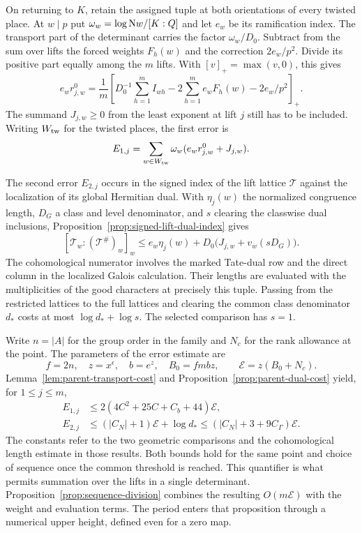 On returning to \(K\), retain the assigned tuple at both orientations of every twisted place. At \(w\mid p\) put \(\omega_w=\log{\rm N}w/[K:\mathbb Q]\) and let \(e_w\) be its ramification index. The transport part of the determinant carries the factor \(\omega_w/D_0\). Subtract from the sum over lifts the forced weights \(F_h(w)\) and the correction \(2e_w/p^2\). Divide its positive part equally among the \(m\) lifts. With \([v]_+=\max(v,0)\), this gives
\[
 e_w r^0_{j,w}=\frac1m\left[
 D_0^{-1}\sum_{h=1}^m I_{wh}-2\sum_{h=1}^m e_wF_h(w)-2e_w/p^2\right]_+ .
\]
The summand \(J_{j,w}\ge0\) from the least exponent at lift \(j\) still has to be included. Writing \(W_{\rm tw}\) for the twisted places, the first error is
\[
           E_{1,j}=\sum_{w\in W_{\rm tw}}\omega_w(e_wr^0_{j,w}+J_{j,w}).
\]

The second error \(E_{2,j}\) occurs in the signed index of the lift lattice \(\mathcal T\) against the localization of its global Hermitian dual. With \(\eta_j(w)\) the normalized congruence length, \(D_G\) a class and level denominator, and \(s\) clearing the classwise dual inclusions, Proposition~\ref{prop:signed-lift-dual-index} gives
\[
 [\mathcal T_w:(\mathcal T^\#)_w]_w
          \le e_w\eta_j(w)+D_0\bigl(J_{j,w}+v_w(sD_G)\bigr).
\]
The cohomological numerator involves the marked Tate-dual row and the direct column in the localized Galois calculation. Their lengths are evaluated with the multiplicities of the good characters at precisely this tuple. Passing from the restricted lattices to the full lattices and clearing the common class denominator \(d_*\) costs at most \(\log d_*+\log s\). The selected comparison has \(s=1\).

Write \(n=|A|\) for the group order in the family and \(N_c\) for the rank allowance at the point. The parameters of the error estimate are
\[
     f=2n,\quad z=x^\epsilon,\quad b=e^z,\quad
     B_0=fmbz,\qquad \mathcal E=z(B_0+N_c).
\] Lemma~\ref{lem:parent-transport-cost} and Proposition~\ref{prop:parent-dual-cost} yield, for \(1\le j\le m\),
\[
 \begin{aligned}
 E_{1,j}&\le 2(4C^2+25C+C_b+44)\mathcal E,\\
 E_{2,j}&\le (|C_N|+1)\mathcal E+\log d_*
              \le (|C_N|+3+9C_\Gamma)\mathcal E .
 \end{aligned}
\]
The constants refer to the two geometric comparisons and the cohomological length estimate in those results. Both bounds hold for the same point and choice of sequence once the common threshold is reached. This quantifier is what permits summation over the lifts in a single determinant. Proposition~\ref{prop:sequence-division} combines the resulting \(O(m\mathcal E)\) with the weight and evaluation terms. The period enters that proposition through a numerical upper height, defined even for a zero map.

